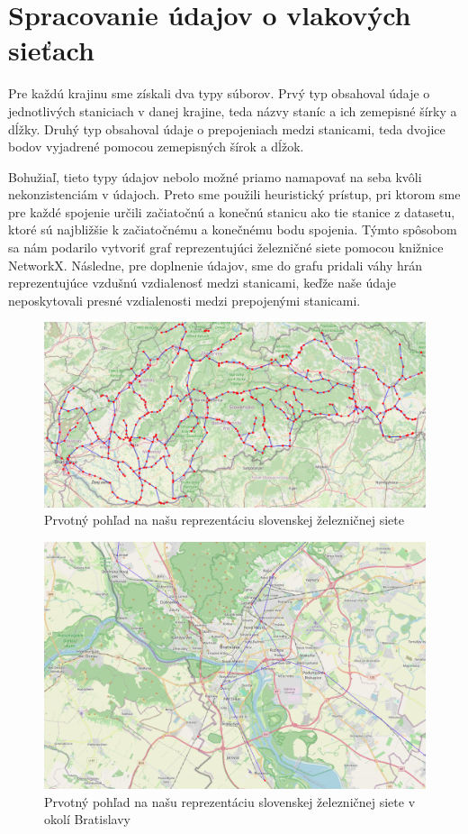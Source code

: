 \documentclass[main.tex]{subfiles}
\begin{document}
	
\section{Spracovanie údajov o vlakových sieťach}

Pre každú krajinu sme získali dva typy súborov. Prvý typ obsahoval údaje o jednotlivých staniciach v danej krajine, teda názvy staníc a ich zemepisné šírky a dĺžky. Druhý typ obsahoval údaje o prepojeniach medzi stanicami, teda dvojice bodov vyjadrené pomocou zemepisných šírok a dĺžok.

Bohužiaľ, tieto typy údajov nebolo možné priamo namapovať na seba kvôli nekonzistenciám v údajoch. Preto sme použili heuristický prístup, pri ktorom sme pre každé spojenie určili začiatočnú a konečnú stanicu ako tie stanice z datasetu, ktoré sú najbližšie k začiatočnému a konečnému bodu spojenia. Týmto spôsobom sa nám podarilo vytvoriť graf reprezentujúci železničné siete pomocou knižnice NetworkX. Následne, pre doplnenie údajov, sme do grafu pridali váhy hrán reprezentujúce vzdušnú vzdialenosť medzi stanicami, keďže naše údaje neposkytovali presné vzdialenosti medzi prepojenými stanicami.

\begin{figure}
\centerline{\includegraphics[width=1.2\textwidth]{images/first_attempt_slovakia.png}}
\caption{Prvotný pohľad na našu reprezentáciu slovenskej železničnej siete}
\label{obr:Slovakia_first}
\end{figure}

\begin{figure}
\centerline{\includegraphics[width=1.2\textwidth]{images/first_attempt_bratislava.png}}
\caption{Prvotný pohľad na našu reprezentáciu slovenskej železničnej siete v okolí Bratislavy}
\label{obr:Bratislava_first}
\end{figure}
\end{document}
